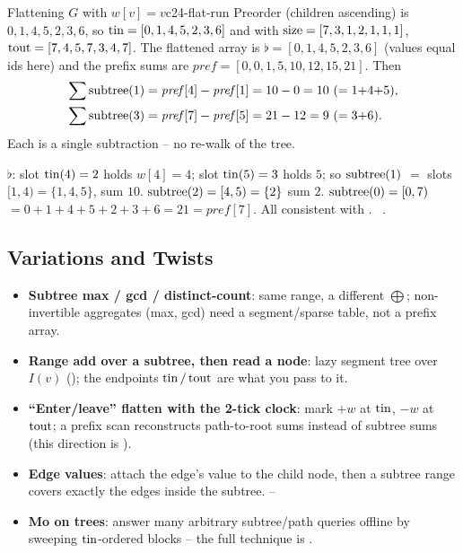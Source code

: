 \begin{example}{Flattening $G$ with $w[v]=v$}{c24-flat-run}
Preorder (children ascending) is $0,1,4,5,2,3,6$, so
$\operatorname{tin}=[0,1,4,5,2,3,6]$ and with $\operatorname{size}=[7,3,1,2,1,1,1]$, $\operatorname{tout}=[7,4,5,7,3,4,7]$.
The flattened array is $\flat=[0,1,4,5,2,3,6]$ (values equal ids here) and the prefix sums
are $\mathit{pref}=[0,0,1,5,10,12,15,21]$. Then
\[
 \begin{aligned}
 \sum\subtree(1)&=\mathit{pref}[4]-\mathit{pref}[1]=10-0=10\ (=1{+}4{+}5),\\
 \sum\subtree(3)&=\mathit{pref}[7]-\mathit{pref}[5]=21-12=9\ (=3{+}6).
 \end{aligned}
\]
Each is a single subtraction -- no re-walk of the tree.
\end{example}
\begin{tracebox}
$\flat$: slot $\operatorname{tin}(4)=2$ holds $w[4]=4$; slot $\operatorname{tin}(5)=3$ holds $5$; so $\operatorname{subtree}(1)$
$=$ slots $[1,4)=\{1,4,5\}$, sum $10$. $\operatorname{subtree}(2)=[4,5)=\{2\}$ sum $2$. $\operatorname{subtree}(0)=[0,7)$
$=0{+}1{+}4{+}5{+}2{+}3{+}6=21=\mathit{pref}[7]$. All consistent with .
\checkmark\ .
\end{tracebox}

\subsection{Variations and Twists}

\begin{itemize}[nosep]
  \item \textbf{Subtree max / gcd / distinct-count}: same range, a different $\bigoplus$;
        non-invertible aggregates (max, gcd) need a segment/sparse table, not a prefix array. \hfill{}
  \item \textbf{Range add over a subtree, then read a node}: lazy segment tree over $I(v)$
        (); the endpoints $\operatorname{tin}/\operatorname{tout}$ are what you pass to it. \hfill{}
  \item \textbf{``Enter/leave'' flatten with the 2-tick clock}: mark $+w$ at $\operatorname{tin}$, $-w$ at
        $\operatorname{tout}$; a prefix scan reconstructs path-to-root sums instead of subtree sums
        (this direction is ). \hfill{}
  \item \textbf{Edge values}: attach the edge's value to the child node, then a subtree
        range covers exactly the edges inside the subtree. \hfill{}--
  \item \textbf{Mo on trees}: answer many arbitrary subtree/path queries offline by
        sweeping $\operatorname{tin}$-ordered blocks -- the full technique is . \hfill{}
\end{itemize}

